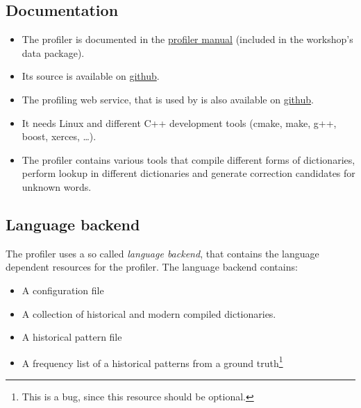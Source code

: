 \subsection{Documentation}
\begin{frame}
	\begin{itemize}
		\item The profiler is documented in the
			\href{https://github.com/cisocrgroup/Resources/blob/master/manuals/profiler-manual.pdf}{profiler
			manual} (included in the workshop's data package).
		\item Its source is available on \href{https://github.com/cisocrgroup/Profiler}{github}.
		\item The profiling web service, that is used by \pocoto{} is also available
			on \href{https://github.com/cisocrgroup/ProfilerWebService}{github}.
		\item It needs Linux and different C++ development tools (cmake, make, g++,
			boost, xerces, \dots).
		\item The profiler contains various tools that compile different forms of
			dictionaries, perform lookup in different dictionaries and generate
			correction candidates for unknown words.
	\end{itemize}
\end{frame}

\subsection{Language backend}
\begin{frame}
	The profiler uses a so called \emph{language backend}, that contains the
	language dependent resources for the profiler. The language backend contains:
	\begin{itemize}
		\item A configuration file
		\item A collection of historical and modern compiled dictionaries.
		\item A historical pattern file
		\item A frequency list of a historical patterns from a ground
			truth\footnote{This is a bug, since this resource should be optional.}
	\end{itemize}
\end{frame}

